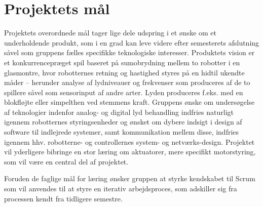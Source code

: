 \section{Projektets mål} 

Projektets overordnede mål tager lige dele udspring i et ønske om et underholdende produkt, som i en grad kan leve videre efter semesterets afslutning såvel som gruppens fælles specifikke teknologiske interesser.
Produktets vision er et konkurrencepræget spil baseret på sumobrydning mellem to robotter i en glasmontre, hvor robotternes retning og hastighed styres på en hidtil ukendte måder – herunder analyse af lydniveauer og frekvenser som produceres af de to spillere såvel som sensorinput af andre arter.
Lyden produceres f.eks. med en blokfløjte eller simpelthen ved stemmens kraft.
Gruppens ønske om undersøgelse af teknologier indenfor analog- og digital lyd behandling indfries naturligt igennem robotternes styringsenheder og ønsket om dybere indsigt i design af software til indlejrede systemer, samt kommunikation mellem disse, indfries igennem hhv. robotterne- og controllernes system- og netværks-design.
Projektet vil yderligere bibringe en stor læring om aktuatorer, mere specifikt motorstyring, som vil være en central del af projektet.

Foruden de faglige mål for læring ønsker gruppen at styrke kendskabet til Scrum som vil anvendes til at styre en iterativ arbejdsproces, som adskiller sig fra processen kendt fra tidligere semestre. 

